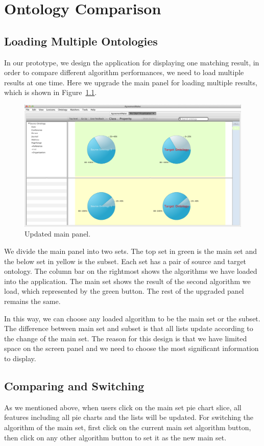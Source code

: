 \chapter{Ontology Comparison}

\section{Loading Multiple Ontologies} %
\label{sub:loading_multiple_ontology}
In our prototype, we design the application for displaying one matching result, in order to compare different algorithm performances, we need to load multiple results at one time. Here we upgrade the main panel for loading multiple results, which is shown in Figure~\ref{fig:updated_main_panel}. 

\begin{figure}[!ht]
	\centering
	\includegraphics[width=6.5in]{pics/gui2.png}
	\caption{Updated main panel.}
	\label{fig:updated_main_panel}
\end{figure}

We divide the main panel into two sets. The top set in green is the main set and the below set in yellow is the subset. Each set has a pair of source and target ontology. The column bar on the rightmost shows the algorithms we have loaded into the application. The main set shows the result of the second algorithm we load, which represented by the green button. The rest of the upgraded panel remains the same.

In this way, we can choose any loaded algorithm to be the main set or the subset. The difference between main set and subset is that all lists update according to the change of the main set. The reason for this design is that we have limited space on the screen panel and we need to choose the most significant information to display.

\section{Comparing and Switching} %
\label{sub:comparing_and_switching}
As we mentioned above, when users click on the main set pie chart slice, all features including all pie charts and the lists will be updated. For switching the algorithm of the main set, first click on the current main set algorithm button, then click on any other algorithm button to set it as the new main set.

